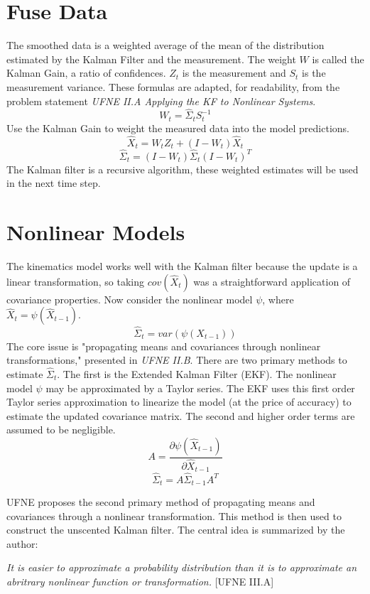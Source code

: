 \documentclass{article}
\begin{document}
\section{Fuse Data}
The smoothed data is a weighted average of the mean of the distribution estimated by the Kalman Filter and the measurement. The weight $W$ is called the Kalman Gain, a ratio of confidences. $Z_t$ is the measurement and $S_t$ is the measurement variance. These formulas are adapted, for readability, from the problem statement \textit{UFNE II.A Applying the KF to Nonlinear Systems}.
\[
	W_t = \hat \Sigma_t S_t^{-1}
\]
Use the Kalman Gain to weight the measured data into the model predictions.
\[
	\hat X_t = W_t Z_t + (I - W_t) \hat X_t
\]
\[
	\hat \Sigma_t = (I - W_t) \hat \Sigma_t (I - W_t)^T
\]
The Kalman filter is a recursive algorithm, these weighted estimates will be used in the next time step.

\section{Nonlinear Models}
The kinematics model works well with the Kalman filter because the update is a linear transformation, so taking $cov(\hat X_t)$ was a straightforward application of covariance properties. Now consider the nonlinear model $\psi$, where $\hat X_t = \psi(\hat X_{t-1})$.
\[
	\hat \Sigma_t = var(\psi(X_{t-1}))
\]
The core issue is "propagating means and covariances through nonlinear transformations," presented in \textit{UFNE II.B}. There are two primary methods to estimate $\hat \Sigma_t$. The first is the Extended Kalman Filter (EKF). The nonlinear model $\psi$ may be approximated by a Taylor series. The EKF uses this first order Taylor series approximation to linearize the model (at the price of accuracy) to estimate the updated covariance matrix. The second and higher order terms are assumed to be negligible.
\[
	A = \frac{\partial \psi(\hat X_{t - 1})}{\partial \hat X_{t-1}}
\]
\[
	\hat \Sigma_t = A \hat \Sigma_{t - 1}A^T
\]

UFNE proposes the second primary method of propagating means and covariances through a nonlinear transformation. This method is then used to construct the unscented Kalman filter. The central idea is summarized by the author:

\textit{It is easier to approximate a probability distribution than it is to approximate an abritrary nonlinear function or transformation.} [UFNE III.A]
\end{document}
